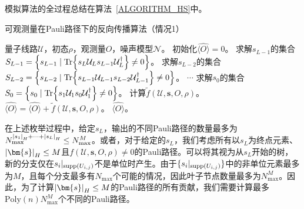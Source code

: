 模拟算法的全过程总结在算法~\ref{ALGORITHM_HS}中。
\begin{algorithm}[H]
    \caption{可观测量在Pauli路径下的反向传播算法（情况1）}
    \label{ALGORITHM_HS}
    \begin{algorithmic}[1]
        \REQUIRE 量子线路$\mathcal{U}$，初态$\rho$，观测量$O$，噪声模型$\mathcal{N}$。
        \STATE 初始化$\widehat{\langle O \rangle}=0$。
            \STATE 求解$s_{L-1}$的集合$S_{L-1}=\left\{s_{L-1}\mid \Tr{s_L \mathcal{U}_L s_{L-1} \mathcal{U}_L^\dagger}\neq 0\right\}$。
                    \STATE 求解$s_{L-2}$的集合$S_{L-2}=\left\{s_{L-2}\mid \Tr{s_{L-1} \mathcal{U}_{L-1} s_{L-2} \mathcal{U}_{L-1}^\dagger}\neq 0\right\}$。
                            \STATE $\cdots$
                            \STATE 求解$s_{0}$的集合$S_{0}=\left\{s_{0}\mid \Tr{s_{1} \mathcal{U}_{1} s_{0} \mathcal{U}_{1}^\dagger}\neq 0\right\}$。
                                    \STATE 计算$\tilde{f}(\mathcal{U},\bm{s},O,\rho)$。
                                    \STATE $\widehat{\langle O \rangle}=\widehat{\langle O \rangle}+\tilde{f}(\mathcal{U},\bm{s},O,\rho)$。
                                \ENDIF
                            \ENDFOR
                        \ENDIF
                    \ENDFOR
                \ENDIF
            \ENDFOR
        \ENDFOR
        \RETURN $\widehat{\langle O \rangle}$。
    \end{algorithmic}
\end{algorithm}

在上述枚举过程中，给定$s_L$，输出的不同Pauli路径的数量最多为$N_{\text{max}}^{\abs{s_1}_H+\cdots+\abs{s_L}_H}\leq N_{\text{max}}^{M}$。或者，对于给定的$s_L$，我们考虑所有以$s_L$为终点元素、$\abs{\bm{s}}_H\leq M$且$f(\mathcal{U},\bm{s},O,\rho)\neq 0$的Pauli路径。可以将其视为从$s_L$开始的树，新的分支仅在$s_{i}|_{\text{supp}(U_{i,j})}$不是单位时产生。由于$\{s_{i}|_{\text{supp}(U_{i,j})}\}$中的非单位元素最多为$M$，且每个分支最多有$N_{\text{max}}$个可能的情况，因此叶子节点数量最多为$N_{\text{max}}^{M}$。因此，为了计算$\abs{\bm{s}}_H\leq M$的Pauli路径的所有贡献，我们需要计算最多$\mathrm{Poly}(n) N_{\text{max}}^{M}$个不同的Pauli路径。

